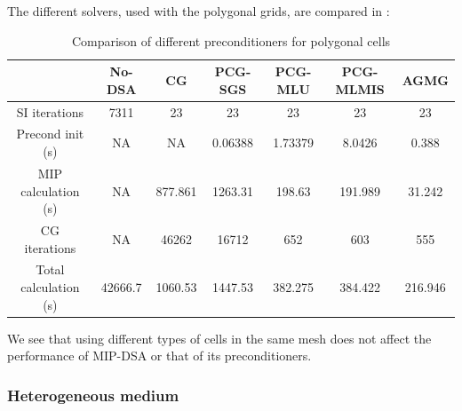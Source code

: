 The different solvers, used with the polygonal grids, are compared in
:
\begin{table}[H]
  \begin{center}
    \caption{Comparison of different preconditioners for polygonal cells}
    \begin{tabular}{|c|c|c|c|c|c|c|}
      \hline
      & No-DSA & CG & PCG-SGS & PCG-MLU & PCG-MLMIS & AGMG \\
      \hline
      SI iterations   & 7311    & 23      & 23      & 23      & 23      & 23 \\
   Precond init (s)   & NA      & NA      & 0.06388 & 1.73379 & 8.0426  & 0.388 \\
MIP calculation (s)   & NA      & 877.861 & 1263.31 & 198.63  & 191.989 &
      31.242 \\
      CG iterations   & NA      & 46262   & 16712   & 652     & 603     & 555 \\
Total calculation (s) & 42666.7 & 1060.53 & 1447.53 & 382.275 & 384.422 &
      216.946 \\
      \hline
    \end{tabular}
    \label{comparison_homog_poly}
  \end{center}
\end{table}
We see that using different types of cells in the same mesh does not affect
the performance of MIP-DSA or that of its preconditioners.

\subsubsection{Heterogeneous medium}

